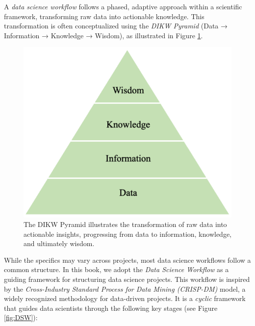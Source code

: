 \documentclass[
]{book}
\theoremstyle{definition}
\theoremstyle{definition}
\theoremstyle{definition}
\theoremstyle{definition}
\theoremstyle{remark}
\begin{document}
A \emph{data science workflow} follows a phased, adaptive approach within a scientific framework, transforming raw data into actionable knowledge. This transformation is often conceptualized using the \emph{DIKW Pyramid} (Data → Information → Knowledge → Wisdom), as illustrated in Figure \ref{fig:DIKW-Pyramid}.

\begin{figure}

{\centering \includegraphics[width=0.4\linewidth]{images/DIKW-Pyramid} 

}

\caption{The DIKW Pyramid illustrates the transformation of raw data into actionable insights, progressing from data to information, knowledge, and ultimately wisdom.}\label{fig:DIKW-Pyramid}
\end{figure}

While the specifics may vary across projects, most data science workflows follow a common structure. In this book, we adopt the \emph{Data Science Workflow} as a guiding framework for structuring data science projects. This workflow is inspired by the \emph{Cross-Industry Standard Process for Data Mining (CRISP-DM)} model, a widely recognized methodology for data-driven projects. It is a \emph{cyclic} framework that guides data scientists through the following key stages (see Figure \ref{fig:DSW}):
\end{document}
